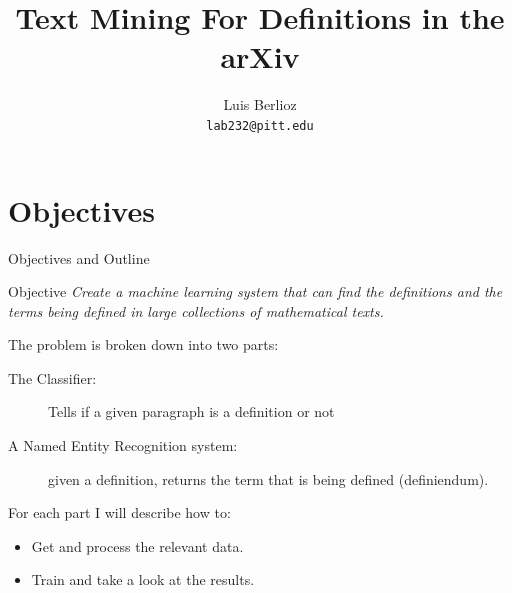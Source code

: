 \documentclass[10pt]{beamer}
\title{Text Mining For Definitions in the arXiv}
\author{Luis Berlioz\\
\texttt{lab232@pitt.edu}}
\institute{University of Pittsburgh}
\begin{document}
\begin{frame}
\titlepage
\end{frame}
\section{Objectives}

\begin{frame}{Objectives and Outline}
    \begin{block}{Objective}
    \textit{Create a machine learning system that can find the definitions and the terms being defined in large collections of mathematical texts. }
    \end{block}


    The problem is broken down into two parts:
\begin{description}
    \item[The Classifier:] Tells if a given paragraph is a definition or not
    \item[A Named Entity Recognition system:] given a definition, returns the term that is being defined (definiendum).
\end{description}
For each part I will describe how to:
        \begin{itemize}
                \item Get and process the relevant  data.
                \item Train and take a look at the results.
        \end{itemize}
\end{frame}
\end{document}
